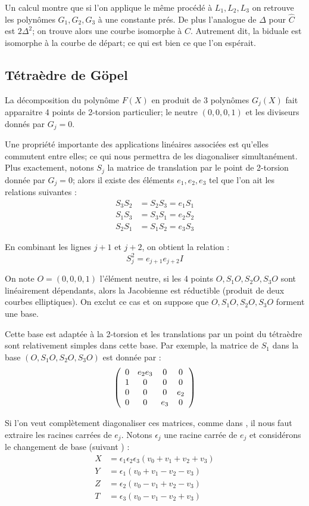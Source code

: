 \documentclass[a4paper]{article}
\theoremstyle{definition}
\theoremstyle{remark}
\numberwithin{equation}{section}
\begin{document}
Un calcul montre que si l'on applique le même procédé à $L_1,L_2,L_3$ on retrouve les polynômes $G_1,G_2,G_3$ à une constante prés. De plus l'analogue de $\Delta$ pour $\hat{C}$ est $2\Delta^2$; on trouve alors une courbe isomorphe à $C$. Autrement dit, la biduale est isomorphe à la courbe de départ; ce qui est bien ce que l'on espérait.

\subsection{Tétraèdre de G\"opel}
La décomposition du polynôme $F(X)$ en produit de 3 polynômes $G_j(X)$ fait apparaitre 4 points de 2-torsion particulier; le neutre $(0,0,0,1)$ et les diviseurs donnés par $G_j=0$.

Une propriété importante des applications linéaires associées est qu'elles commutent entre elles; ce qui nous permettra de les diagonaliser simultanément. Plus exactement, notons $S_j$ la matrice de translation par le point de 2-torsion donnée par $G_j=0$; alors il existe des éléments $e_1,e_2,e_3$ tel que l'on ait les relations suivantes :
\begin{align}
S_3S_2 &= S_2S_3 = e_1S_1 \\
S_1S_3 &= S_3S_1 = e_2S_2 \\
S_2S_1 &= S_1S_2 = e_3S_3
\end{align}

En combinant les lignes $j+1$ et $j+2$, on obtient la relation :
$$S_j^2 = e_{j+1}e_{j+2}I$$

On note $O=(0,0,0,1)$ l'élément neutre, si les 4 points $O,S_1O,S_2O,S_3O$ sont linéairement dépendants, alors la Jacobienne est réductible (produit de deux courbes elliptiques). On exclut ce cas et on suppose que $O,S_1O,S_2O,S_3O$ forment une base.

Cette base est adaptée à la 2-torsion et les translations par un point du tétraèdre sont relativement simples dans cette base. Par exemple, la matrice de $S_1$ dans la base  $(O,S_1O,S_2O,S_3O)$ est donnée par :
\[ \left(
  \begin{array}{ c c c c}
     0 & e_2e_3 & 0  & 0  \\
     1 & 0   & 0  & 0  \\
     0 & 0   & 0  & e_2 \\
     0 & 0   & e_3  & 0  \\
  \end{array} \right)
\]

Si l'on veut complètement diagonaliser ces matrices, comme dans \citep{gaudry}, il nous faut extraire les racines carrées de $e_j$. Notons $\epsilon_j$ une racine carrée de $e_j$ et considérons le changement de base (suivant \citet{cassels-Flynn}) :
\begin{align}
\label{chgBase}
X &= \epsilon_1\epsilon_2\epsilon_3(v_0+v_1+v_2+v_3) \\
Y &= \epsilon_1(v_0+v_1-v_2-v_3) \\
Z &= \epsilon_2(v_0-v_1+v_2-v_3) \\
T &= \epsilon_3(v_0-v_1-v_2+v_3)
\end{align}
\end{document}
